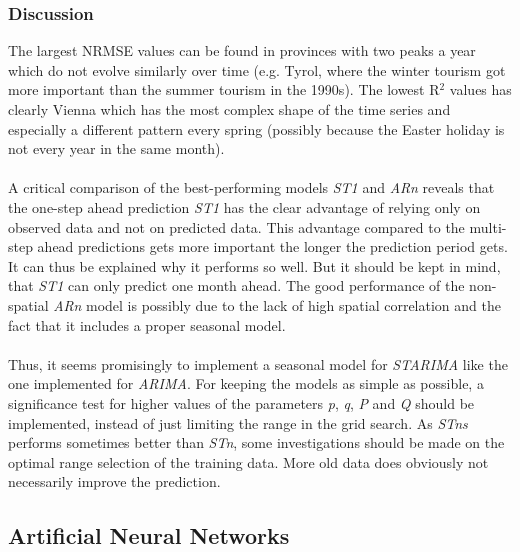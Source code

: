\documentclass[a4paper,reqno,]{article}
\begin{document}
\subsubsection{Discussion}
The largest NRMSE values can be found in provinces with two peaks a year which do not evolve similarly over time (e.g. Tyrol, where the winter tourism got more important than the summer tourism in the 1990s). The lowest R$^2$ values has clearly Vienna which has the most complex shape of the time series and especially a different pattern every spring (possibly because the  Easter holiday is not every year in the same month).
\\
\\
A critical comparison of the best-performing models \textit{ST1} and \textit{ARn} reveals that the one-step ahead prediction \textit{ST1} has the clear advantage of relying only on observed data and not on predicted data. This advantage compared to the multi-step ahead predictions gets more important the longer the prediction period gets. It can thus be explained why it performs so well. But it should be kept in mind, that \textit{ST1} can only predict one month ahead. The good performance of the non-spatial \textit{ARn} model is possibly due to the lack of high spatial correlation and the fact that it includes a proper seasonal model.
\\
\\
Thus, it seems promisingly to implement a seasonal model for \textit{STARIMA} like the one implemented for \textit{ARIMA}. For keeping the models as simple as possible, a significance test for higher values of the parameters \textit{p}, \textit{q}, \textit{P} and \textit{Q} should be implemented, instead of just limiting the range in the grid search. As \textit{STns} performs sometimes better than \textit{STn}, some investigations should be made on the optimal range selection of the training data. More old data does obviously not necessarily improve the prediction.
\subsection{Artificial Neural Networks}
\label{ssec:ann}
\end{document}
